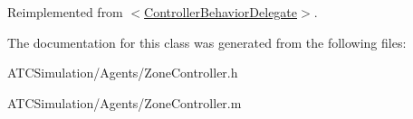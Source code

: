 \-Reimplemented from \hyperlink{protocol_controller_behavior_delegate-p_a472f0aba04d2caffc0035e0356b2f85c}{$<$\-Controller\-Behavior\-Delegate$>$}.



\-The documentation for this class was generated from the following files\-:\begin{DoxyCompactItemize}
\item 
\-A\-T\-C\-Simulation/\-Agents/\-Zone\-Controller.\-h\item 
\-A\-T\-C\-Simulation/\-Agents/\-Zone\-Controller.\-m\end{DoxyCompactItemize}
